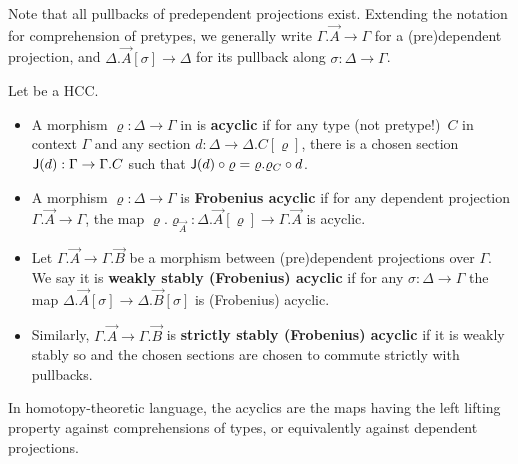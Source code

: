 \documentclass{amsart}
\begin{document}
Note that all pullbacks of predependent projections exist.
Extending the notation for comprehension of pretypes, we generally write $\Gamma.\vec{A} \to \Gamma$ for a (pre)dependent projection, and $\Delta.\vec{A}[\sigma] \to \Delta$ for its pullback along $\sigma:\Delta\to\Gamma$.

\begin{defn}
  Let \E be a HCC.
  \begin{itemize}
  \item A morphism $\varrho:\Delta\to\Gamma$ in \E is \textbf{acyclic} if for any type (not pretype!)\ $C$ in context $\Gamma$ and any section $d : \Delta \to \Delta.C[\varrho]$, there is a chosen section $\mathsf{J}(d) : \Gamma \to \Gamma.C$ such that $\mathsf{J}(d) \circ \varrho = \varrho.\varrho_C \circ d$.
  \item A morphism $\varrho:\Delta\to\Gamma$ is \textbf{Frobenius acyclic} if for any dependent projection $\Gamma.\vec{A}\to \Gamma$, the map $\varrho.\varrho_{\vec{A}} : \Delta.\vec{A}[\varrho] \to \Gamma.\vec{A}$ is acyclic.
  \item Let $\Gamma.\vec{A} \to \Gamma.\vec{B}$ be a morphism between (pre)dependent projections over $\Gamma$.
    We say it is \textbf{weakly stably (Frobenius) acyclic} if for any $\sigma:\Delta\to \Gamma$ the map $\Delta.\vec{A}[\sigma] \to \Delta.\vec{B}[\sigma]$ is (Frobenius) acyclic.
  \item Similarly, $\Gamma.\vec{A} \to \Gamma.\vec{B}$ is \textbf{strictly stably (Frobenius) acyclic} if it is weakly stably so and the chosen sections are chosen to commute strictly with pullbacks.
  \end{itemize}
\end{defn}

In homotopy-theoretic language, the acyclics are the maps having the left lifting property against comprehensions of types, or equivalently against dependent projections.
\end{document}
